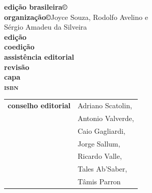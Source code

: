\newcommand{\linha}[2]{\ifdef{#2}{\linhalayout{#1}{#2}}{}}

\begingroup\tiny
\parindent=0cm
\thispagestyle{empty}

\textbf{edição brasileira©}\\
\textbf{organização©}\quad Joyce Souza, Rodolfo Avelino e\\Sérgio Amadeu da Silveira\\


\textbf{edição}\\
\textbf{coedição}\\
\textbf{assistência editorial}\\
\textbf{revisão}\\
\textbf{capa}\\

\textbf{\textsc{isbn}}

\hspace{-5pt}\begin{tabular}{ll}
\textbf{conselho editorial} & Adriano Scatolin,  \\
							& Antonio Valverde,  \\
							& Caio Gagliardi,    \\
							& Jorge Sallum,      \\
							& Ricardo Valle,     \\
							& Tales Ab'Saber,    \\
							& Tâmis Parron      
\end{tabular}
 
